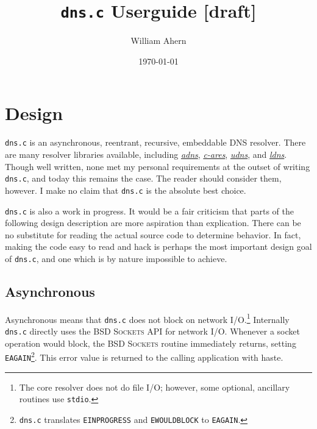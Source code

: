 \documentclass[11pt, oneside]{memoir}
\newcommand*{\dnsc}[0]{\texttt{dns.c}\xspace}
\begin{document}
%                   
\title{\dnsc Userguide [draft]}
\date{\today}
\author{William Ahern}
\maketitle

\tableofcontents


\clearpage

\setcounter{page}{1}

\chapter{Design}

\dnsc is an asynchronous, reentrant, recursive, embeddable DNS resolver. There are many resolver libraries available, including \href{http://www.chiark.greenend.org.uk/~ian/adns/}{\textit{adns}}, \href{http://c-ares.haxx.se/}{\textit{c-ares}}, \href{http://www.corpit.ru/mjt/udns.html}{\textit{udns}}, and \href{http://nlnetlabs.nl/projects/ldns/}{\textit{ldns}}. Though well written, none met my personal requirements at the outset of writing \dnsc, and today this remains the case. The reader should consider them, however. I make no claim that \dnsc is the absolute best choice.

\dnsc is also a work in progress. It would be a fair criticism that parts of the following design description are more aspiration than explication. There can be no substitute for reading the actual source code to determine behavior. In fact, making the code easy to read and hack is perhaps the most important design goal of \dnsc, and one which is by nature impossible to achieve.

\section{Asynchronous}

Asynchronous means that \dnsc does not block on network I/O.\footnote{The core resolver does not do file I/O; however, some optional, ancillary routines use \texttt{stdio}.} Internally \dnsc directly uses the \textsc{BSD Sockets} API for network I/O. Whenever a socket operation would block, the \textsc{BSD Sockets} routine immediately returns, setting \texttt{EAGAIN}\footnote{\dnsc translates \texttt{EINPROGRESS} and \texttt{EWOULDBLOCK} to \texttt{EAGAIN}.}. This error value is returned to the calling application with haste.
\end{document}
